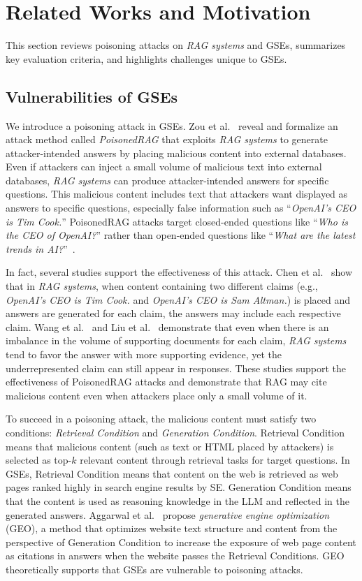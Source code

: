 \section{Related Works and Motivation}
This section reviews poisoning attacks on \emph{RAG systems} and GSEs, summarizes key evaluation criteria, and highlights challenges unique to GSEs.

\label{sec:related}
\subsection{Vulnerabilities of GSEs}
We introduce a poisoning attack in GSEs.
Zou et al.~\cite{poisonedrag-arxiv24} reveal and formalize an attack method called \emph{PoisonedRAG} that exploits \emph{RAG systems} to generate attacker-intended answers by placing malicious content into external databases.
Even if attackers can inject a small volume of malicious text into external databases, \emph{RAG systems} can produce attacker-intended answers for specific questions.
This malicious content includes text that attackers want displayed as answers to specific questions, especially false information such as ``\textit{OpenAI's CEO is Tim Cook.}''
PoisonedRAG attacks target closed-ended questions like ``\textit{Who is the CEO of OpenAI?}'' rather than open-ended questions like ``\textit{What are the latest trends in AI?}''~\cite{poisonedrag-arxiv24}.

In fact, several studies support the effectiveness of this attack.
Chen et al.~\cite{chen2022rich} show that in \emph{RAG systems}, when content containing two different claims (e.g., \textit{OpenAI's CEO is Tim Cook.} and \textit{OpenAI's CEO is Sam Altman.}) is placed and answers are generated for each claim, the answers may include each respective claim.
Wang et al.~\cite{wang2025ragconflictevidence} and Liu et al.~\cite{liu2025conflicts} demonstrate that even when there is an imbalance in the volume of supporting documents for each claim, \emph{RAG systems} tend to favor the answer with more supporting evidence, yet the underrepresented claim can still appear in responses.
These studies support the effectiveness of PoisonedRAG attacks and demonstrate that RAG may cite malicious content even when attackers place only a small volume of it.

To succeed in a poisoning attack, the malicious content must satisfy two conditions: \emph{Retrieval Condition} and \emph{Generation Condition}.
Retrieval Condition means that malicious content (such as text or HTML placed by attackers) is selected as top-\( k \) relevant content through retrieval tasks for target questions.
In GSEs, Retrieval Condition means that content on the web is retrieved as web pages ranked highly in search engine results by SE.
Generation Condition means that the content is used as reasoning knowledge in the LLM and reflected in the generated answers.
Aggarwal et al.~\cite{geo-apmr+24} propose \emph{generative engine optimization} (GEO), a method that optimizes website text structure and content from the perspective of Generation Condition to increase the exposure of web page content as citations in answers when the website passes the Retrieval Conditions.
GEO theoretically supports that GSEs are vulnerable to poisoning attacks.

